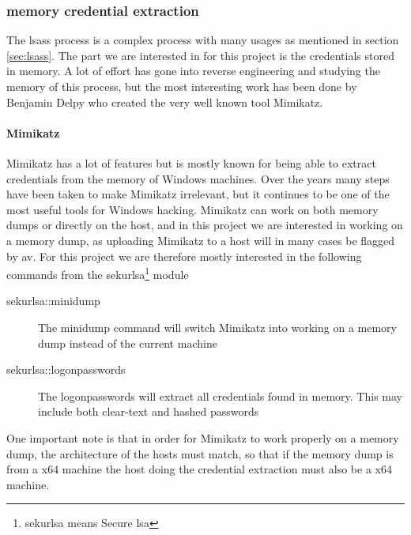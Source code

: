 \documentclass{article}
\begin{document}
\subsubsection{ memory credential extraction}
The \gls{lsass} process is a complex process with many usages as mentioned in section \ref{sec:lsass}. The part we are interested in for this project is the credentials stored in memory. A lot of effort has gone into reverse engineering and studying the memory of this process, but the most interesting work has been done by Benjamin Delpy who created the very well known tool Mimikatz\cite{url:lsass:mimikatz}.
\label{sec:mimikatz}
\paragraph{Mimikatz} Mimikatz has a lot of features but is mostly known for being able to extract credentials from the memory of Windows machines. Over the years many steps have been taken to make Mimikatz irrelevant, but it continues to be one of the most useful tools for Windows hacking. Mimikatz can work on both memory dumps or directly on the host, and in this project we are interested in working on a memory dump, as uploading Mimikatz to a host will in many cases be flagged by \gls{av}. For this project we are therefore mostly interested in the following commands from the sekurlsa\footnote{sekurlsa means Secure \gls{lsa}} module\cite{url:lsass:mimikatz:sekurlsa}

\begin{description}
    \item[sekurlsa::minidump] The minidump command will switch Mimikatz into working on a memory dump instead of the current machine
    \item[sekurlsa::logonpasswords] The logonpasswords will extract all credentials found in memory. This may include both clear-text and hashed passwords
\end{description}

One important note is that in order for Mimikatz to work properly on a memory dump, the architecture of the hosts must match, so that if the memory dump is from a x64 machine the host doing the credential extraction must also be a x64 machine.
\end{document}
